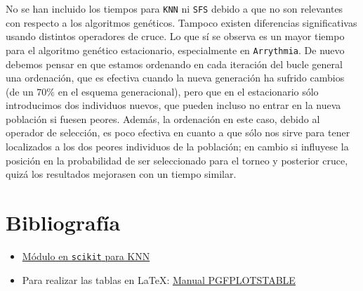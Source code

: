 \documentclass[11pt,leqno]{article}
\begin{document}
No se han incluido los tiempos para \texttt{KNN} ni \texttt{SFS} debido a que no son relevantes con respecto a los algoritmos genéticos. Tampoco existen diferencias significativas usando distintos operadores de cruce. Lo que sí se observa es un mayor tiempo para el algoritmo genético estacionario, especialmente en \texttt{Arrythmia}. De nuevo debemos pensar en que estamos ordenando en cada iteración del bucle general una ordenación, que es efectiva cuando la nueva generación ha sufrido cambios (de un $70\%$ en el esquema generacional), pero que en el estacionario sólo introducimos dos individuos nuevos, que pueden incluso no entrar en la nueva población si fuesen peores. Además, la ordenación en este caso, debido al operador de selección, es poco efectiva en cuanto a que sólo nos sirve para tener localizados a los dos peores individuos de la población; en cambio si influyese la posición en la probabilidad de ser seleccionado para el torneo y posterior cruce, quizá los resultados mejorasen con un tiempo similar.


\section{Bibliografía}
\begin{itemize}
\item \href{http://scikit-learn.org/stable/modules/neighbors.html}{Módulo en \texttt{scikit} para KNN}
\item Para realizar las tablas en \LaTeX: \href{https://www.complang.tuwien.ac.at/doc/texlive-pictures-doc/latex/pgfplots/pgfplotstable.pdf}{Manual PGFPLOTSTABLE}
\end{itemize}
\end{document}
